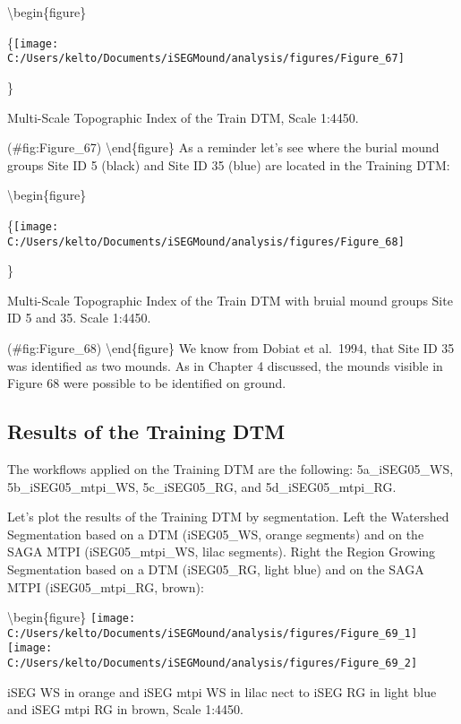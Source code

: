 \documentclass[
]{article}
\begin{document}
\textbackslash begin\{figure\}

\{\centering \texttt{[image: C:/Users/kelto/Documents/iSEGMound/analysis/figures/Figure\_67]}

\}

\caption{Multi-Scale Topographic Index of the Train DTM, Scale 1:4450.}

(\#fig:Figure\_67)
\textbackslash end\{figure\}
As a reminder let's see where the burial mound groups Site ID 5 (black) and Site ID 35 (blue) are located in the Training DTM:

\textbackslash begin\{figure\}

\{\centering \texttt{[image: C:/Users/kelto/Documents/iSEGMound/analysis/figures/Figure\_68]}

\}

\caption{Multi-Scale Topographic Index of the Train DTM with bruial mound groups Site ID 5 and 35. Scale 1:4450.}

(\#fig:Figure\_68)
\textbackslash end\{figure\}
We know from Dobiat et al.~1994, that Site ID 35 was identified as two mounds. As in Chapter 4 discussed, the mounds visible in Figure 68 were possible to be identified on ground.

\hypertarget{results-of-the-training-dtm}{%
\subsection{\texorpdfstring{\textbf{Results of the Training DTM}}{Results of the Training DTM}}\label{results-of-the-training-dtm}}

The workflows applied on the Training DTM are the following:
5a\_iSEG05\_WS, 5b\_iSEG05\_mtpi\_WS, 5c\_iSEG05\_RG, and 5d\_iSEG05\_mtpi\_RG.

Let's plot the results of the Training DTM by segmentation.
Left the Watershed Segmentation based on a DTM (iSEG05\_WS, orange segments) and on the SAGA MTPI (iSEG05\_mtpi\_WS, lilac segments). Right the Region Growing Segmentation based on a DTM (iSEG05\_RG, light blue) and on the SAGA MTPI (iSEG05\_mtpi\_RG, brown):

\textbackslash begin\{figure\}
\texttt{[image: C:/Users/kelto/Documents/iSEGMound/analysis/figures/Figure\_69\_1]} \texttt{[image: C:/Users/kelto/Documents/iSEGMound/analysis/figures/Figure\_69\_2]}

\caption{iSEG WS in orange and iSEG mtpi WS in lilac nect to iSEG RG in light blue and iSEG mtpi RG in brown, Scale 1:4450.}
\end{document}
